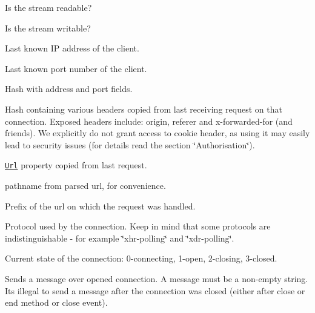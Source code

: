 \begin{DoxyDescription}
\item[Property\+: readable (boolean) ]Is the stream readable?


\item[Property\+: writable (boolean) ]Is the stream writable?


\item[Property\+: remote\+Address (string) ]Last known IP address of the client.


\item[Property\+: remote\+Port (number) ]Last known port number of the client.


\item[Property\+: address (object) ]Hash with \textquotesingle{}address\textquotesingle{} and \textquotesingle{}port\textquotesingle{} fields.


\item[Property\+: headers (object) ]Hash containing various headers copied from last receiving request on that connection. Exposed headers include\+: {\ttfamily origin}, {\ttfamily referer} and {\ttfamily x-\/forwarded-\/for} (and friends). We explicitly do not grant access to {\ttfamily cookie} header, as using it may easily lead to security issues (for details read the section \char`\"{}\+Authorisation\char`\"{}).


\item[Property\+: url (string) ]\href{http://nodejs.org/docs/v0.4.10/api/http.html#request.url}{\tt Url} property copied from last request.


\item[Property\+: pathname (string) ]{\ttfamily pathname} from parsed url, for convenience.


\item[Property\+: prefix (string) ]Prefix of the url on which the request was handled.


\item[Property\+: protocol (string) ]Protocol used by the connection. Keep in mind that some protocols are indistinguishable -\/ for example \char`\"{}xhr-\/polling\char`\"{} and \char`\"{}xdr-\/polling\char`\"{}.


\item[Property\+: ready\+State (integer) ]Current state of the connection\+: 0-\/connecting, 1-\/open, 2-\/closing, 3-\/closed.


\item[write(message) ]Sends a message over opened connection. A message must be a non-\/empty string. It\textquotesingle{}s illegal to send a message after the connection was closed (either after \textquotesingle{}close\textquotesingle{} or \textquotesingle{}end\textquotesingle{} method or \textquotesingle{}close\textquotesingle{} event).



\end{DoxyDescription}
